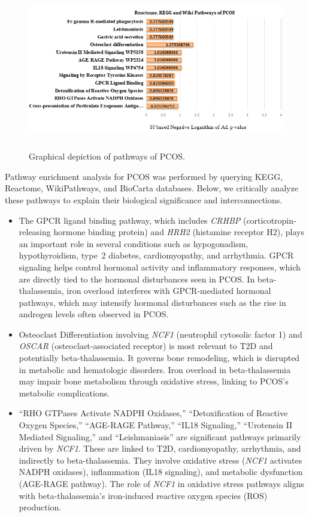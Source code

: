 \begin{figure}[H]
\centering
\includegraphics[height=7cm]{./fig/fig4_6.png} 
\centering
\caption{Graphical depiction of   pathways of PCOS.}
\label{Graphical depiction of   pathways of PCOS.}
\end{figure}


Pathway enrichment analysis for PCOS was performed by querying KEGG, Reactome, WikiPathways, and BioCarta databases. 
Below, we critically analyze these pathways to explain their biological significance and interconnections.

\begin{itemize}
    \item The GPCR ligand binding pathway, which includes \textit{CRHBP} (corticotropin-releasing hormone binding protein) and \textit{HRH2} (histamine receptor H2), plays an important role in several conditions such as hypogonadism, hypothyroidism, type~2 diabetes, cardiomyopathy, and arrhythmia. GPCR signaling helps control hormonal activity and inflammatory responses, which are directly tied to the hormonal disturbances seen in PCOS. In beta-thalassemia, iron overload interferes with GPCR-mediated hormonal pathways, which may intensify hormonal disturbances such as the rise in androgen levels often observed in PCOS.

    \item Osteoclast Differentiation involving \textit{NCF1} (neutrophil cytosolic factor 1) and \textit{OSCAR} (osteoclast-associated receptor) is most relevant to T2D and potentially beta-thalassemia. It governs bone remodeling, which is disrupted in metabolic and hematologic disorders. Iron overload in beta-thalassemia may impair bone metabolism through oxidative stress, linking to PCOS's metabolic complications.

    \item ``RHO GTPases Activate NADPH Oxidases,'' ``Detoxification of Reactive Oxygen Species,'' ``AGE-RAGE Pathway,'' ``IL18 Signaling,'' ``Urotensin II Mediated Signaling,'' and ``Leishmaniasis'' are significant pathways primarily driven by \textit{NCF1}. These are linked to T2D, cardiomyopathy, arrhythmia, and indirectly to beta-thalassemia. They involve oxidative stress (\textit{NCF1} activates NADPH oxidases), inflammation (IL18 signaling), and metabolic dysfunction (AGE-RAGE pathway). The role of \textit{NCF1} in oxidative stress pathways aligns with beta-thalassemia's iron-induced reactive oxygen species (ROS) production.
\end{itemize}

